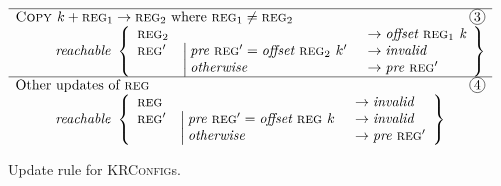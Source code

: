 \begin{figure}
\begin{displaymath}
\begin{array}{l}
      \hline
      \textsc{Copy } k + \textsc{reg}_1 \rightarrow \textsc{reg}_2 \textrm{ where } \textsc{reg}_1 \not= \textsc{reg}_2 \hfill \circled{3}\\
      \hspace{10mm}\textit{reachable }\left\{\begin{array}{lll}
        \textsc{reg}_2 & & \!\!\!\rightarrow \textit{offset }\textsc{reg}_1 \textit{ k} \\
        \textsc{reg}' & \multirow{2}{*}{\begin{math}
            \left|\hspace{-1mm}\begin{array}{l}
              \textit{pre }\textsc{reg}' = \textit{offset }\textsc{reg}_2 \textit{ } k' \\
              \textit{otherwise}\\
            \end{array}\right.
          \end{math}
        } & \!\!\!\rightarrow \mathit{invalid}\\
          & & \!\!\!\rightarrow \textit{pre }\textsc{reg}'\\
      \end{array}\right\}\\

      \hline
      \textrm{Other updates of }\textsc{reg} \hfill \circled{4}\\
      \hspace{10mm}\textit{reachable }\left\{\begin{array}{lll}
        \textsc{reg} & & \!\!\!\rightarrow \textit{invalid} \\
        \textsc{reg}' & \multirow{2}{*}{\begin{math}
            \left|\hspace{-1mm}\begin{array}{l}
              \textit{pre }\textsc{reg}' = \textit{offset }\textsc{reg} \textit{ } k \\
              \textit{otherwise}\\
            \end{array}\right.
          \end{math}
        } & \!\!\!\rightarrow \mathit{invalid}\\
        & & \!\!\!\rightarrow \textit{pre }\textsc{reg}'\\
      \end{array}\right\}\\
      
    \end{array}
  \end{displaymath}
  \caption{Update rule for \textsc{KRConfig}s.}
  \label{fig:known_regs:update_rule}
\end{figure}


